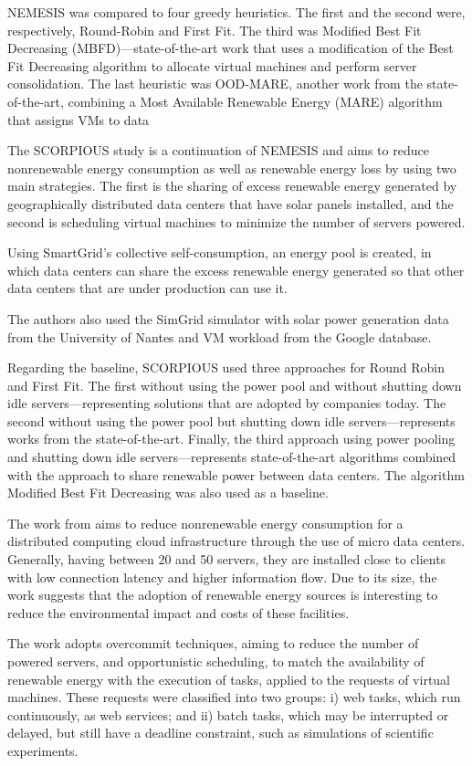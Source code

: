 \documentclass[12pt,a4paper]{article}
\begin{document}
NEMESIS \citep{NEMESIS} was compared to four greedy heuristics. The first and the second were, respectively, Round-Robin and First Fit. The third was Modified Best Fit Decreasing (MBFD)---state-of-the-art work that uses a modification of the Best Fit Decreasing algorithm to allocate virtual machines and perform server consolidation. The last heuristic was OOD-MARE, another work from the state-of-the-art, combining a Most Available Renewable Energy (MARE) algorithm that assigns VMs to data 


The SCORPIOUS study  \citep{SCORPIOUS} is a continuation of NEMESIS and aims to reduce nonrenewable energy consumption as well as renewable energy loss by using two main strategies. The first is the sharing of excess renewable energy generated by geographically distributed data centers that have solar panels installed, and the second is scheduling virtual machines to minimize the number of servers powered.

Using SmartGrid's collective self-consumption, an energy pool is created, in which data centers can share the excess renewable energy generated so that other data centers that are under production can use it. 

The authors also used the SimGrid simulator with solar power generation data from the University of Nantes and VM workload from the Google database.

Regarding the baseline, SCORPIOUS used three approaches for Round Robin and First Fit. The first without using the power pool and without shutting down idle servers---representing solutions that are adopted by companies today. The second without using the power pool but shutting down idle servers---represents works from the state-of-the-art. Finally, the third approach using power pooling and shutting down idle servers---represents state-of-the-art algorithms combined with the approach to share renewable power between data centers. The algorithm Modified Best Fit Decreasing was also used as a baseline.

The work from \citet{PIKA} aims to reduce nonrenewable energy consumption for a distributed computing cloud infrastructure through the use of micro data centers. Generally, having between 20 and 50 servers, they are installed close to clients with low connection latency and higher information flow. Due to its size, the work suggests that the adoption of renewable energy sources is interesting to reduce the environmental impact and costs of these facilities.

The work adopts overcommit techniques, aiming to reduce the number of powered servers, and opportunistic scheduling, to match the availability of renewable energy with the execution of tasks, applied to the requests of virtual machines. These requests were classified into two groups: i) web tasks, which run continuously, as web services; and ii) batch tasks, which may be interrupted or delayed, but still have a deadline constraint, such as simulations of scientific experiments.
\end{document}
